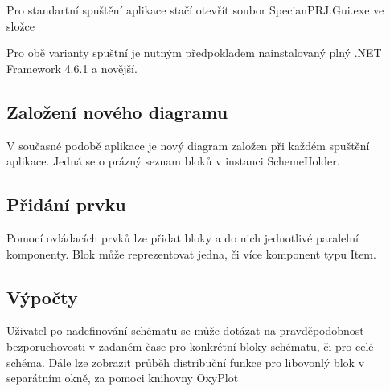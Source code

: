 \documentclass[FM,RP]{tulthesis}
\begin{document}
    Pro standartní spuštění aplikace stačí otevřít soubor SpecianPRJ.Gui.exe ve složce 

    Pro obě varianty spuštní je nutným předpokladem nainstalovaný plný .NET Framework 4.6.1 a novější. 

    \subsection*{Založení nového diagramu}
        V současné podobě aplikace je nový diagram založen při každém spuštění aplikace. Jedná se o prázný seznam bloků v instanci SchemeHolder.
    \subsection*{Přidání prvku}
        Pomocí ovládacích prvků lze přidat bloky a do nich jednotlivé paralelní komponenty. 
        Blok může reprezentovat jedna, či více komponent typu Item.
    \subsection*{Výpočty}
        Uživatel po nadefinování schématu se může dotázat na pravděpodobnost bezporuchovosti v zadaném čase pro konkrétní bloky schématu, či pro celé schéma.
        Dále lze zobrazit průběh distribuční funkce pro libovonlý blok v separátním okně, za pomoci knihovny OxyPlot \cite{15}
\end{document}

